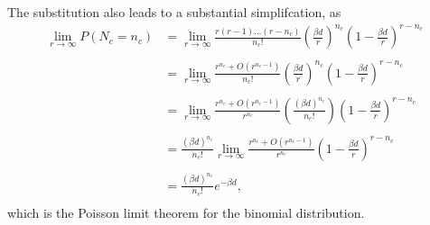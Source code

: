 \documentclass{article}
\begin{document}
The substitution also leads to a substantial simplifcation, as
\begin{equation} \label{eq:poissonlim}
  \begin{split}
    \lim_{r \rightarrow \infty} P(N_c = n_c) & = \lim_{r \rightarrow \infty} \frac{r(r-1)\dots (r-n_c)}{n_c!} \left ( \frac{\beta d}{r} \right )^{n_c} \left ( 1-\frac{\beta d}{r} \right )^{r - n_c} \\
    & \\
    & = \lim_{r \rightarrow \infty} \frac{r^{n_c} + O(r^{n_c-1})}{n_c!} \left ( \frac{\beta d}{r} \right )^{n_c} \left ( 1-\frac{\beta d}{r} \right )^{r - n_c} \\
    & \\
    & = \lim_{r \rightarrow \infty} \frac{r^{n_c} + O(r^{n_c-1})}{r^{n_c}} \left ( \frac{(\beta d)^{n_c}}{n_c!} \right ) \left ( 1-\frac{\beta d}{r} \right )^{r - n_c} \\
    & \\
    & = \frac{(\beta d)^{n_c}}{n_c!} \lim_{r \rightarrow \infty} \frac{r^{n_c} + O(r^{n_c-1})}{r^{n_c}} \left ( 1-\frac{\beta d}{r} \right )^{r - n_c} \\
    & \\
    & = \frac{(\beta d)^{n_c}}{n_c!} e^{-\beta d}, \\
  \end{split}
\end{equation}
\noindent which is the Poisson limit theorem for the binomial distribution.
\end{document}
